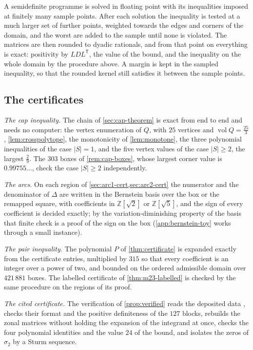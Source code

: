 \documentclass[11pt,reqno]{amsart}
\renewcommand{\_}{\origunderscore\allowbreak}
\numberwithin{equation}{section}
\theoremstyle{plain}
\theoremstyle{definition}
\theoremstyle{remark}
\newcommand{\defect}{\Delta}                 %
\DeclareMathOperator{\vol}{vol}
\begin{document}
A semidefinite programme is solved in floating point with its inequalities
imposed at finitely many sample points. After each solution the inequality
is tested at a much larger set of further points, weighted towards the
edges and corners of the domain, and the worst are added to the sample
until none is violated. The matrices are then rounded to dyadic rationals,
and from that point on everything is exact: positivity by $LDL^{\mathsf T}$,
the value of the bound, and the inequality on the whole domain by the
procedure above. A margin is kept in the sampled inequality, so that the
rounded kernel still satisfies it between the sample points.

\subsection*{The certificates}

\emph{The cap inequality.} The chain of \cref{sec:cap-theorem} is exact from
end to end and needs no computer: the vertex enumeration of $Q$, with $25$
vertices and $\vol Q=\frac{25}3$, \cref{lem:crosspolytope}, the
monotonicity of \cref{lem:monotone}, the three polynomial inequalities of
the case $|S|=1$, and the five vertex values of the case $|S|\ge2$, the
largest $\frac29$. The $303$ boxes of \cref{rem:cap-boxes}, whose largest
corner value is $0.99755\ldots$, check the case $|S|\ge2$ independently.

\emph{The arcs.} On each region of \cref{sec:arc1-cert,sec:arc2-cert} the
numerator and the denominator of $\defect$ are written in the Bernstein
basis over the box or the remapped square, with coefficients in
$\mathbb{Z}[\sqrt2]$ or $\mathbb{Z}[\sqrt5]$, and the sign of every
coefficient is decided exactly; by the variation-diminishing property of
the basis \cite{Far12} that finite check is a proof of the sign on the
box (\cref{app:bernstein-toy} works through a small instance).

\emph{The pair inequality.} The polynomial $P$ of \cref{thm:certificate} is
expanded exactly from the certificate entries, multiplied by $315$ so that
every coefficient is an integer over a power of two, and bounded on the
ordered admissible domain over $421\,881$ boxes. The labelled certificate
of \cref{thm:m23-labelled} is checked by the same procedure on the regions
of its proof.

\emph{The cited certificate.} The verification of \cref{prop:verified}
reads the deposited data \cite{LLM24data}, checks their format and the
positive definiteness of the $127$ blocks, rebuilds the zonal matrices
without holding the expansion of the integrand at once, checks the four
polynomial identities and the value $24$ of the bound, and isolates the
zeros of $\sigma_2$ by a Sturm sequence.
\end{document}
